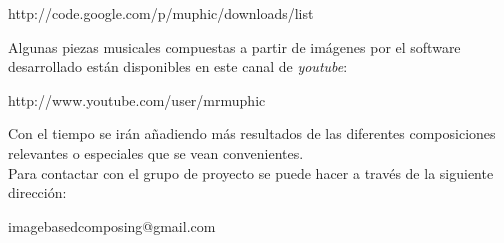 \begin{center}
http://code.google.com/p/muphic/downloads/list
\end{center}

Algunas piezas musicales compuestas a partir de imágenes por el software desarrollado están disponibles en este canal de \emph{youtube}:

\begin{center}
http://www.youtube.com/user/mrmuphic
\end{center}

Con el tiempo se irán añadiendo más resultados de las diferentes composiciones relevantes o especiales que se vean convenientes.\\

Para contactar con el grupo de proyecto se puede hacer a través de la siguiente dirección:

\begin{center}
	imagebasedcomposing@gmail.com
\end{center}